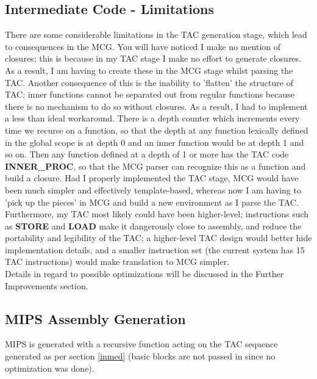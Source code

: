 \documentclass[12pt]{article}
\begin{document}
\subsection{Intermediate Code - Limitations}
There are some considerable limitations in the TAC generation stage, which lead to consequences in the MCG. You will have noticed I make no mention of closures; this is because in my TAC stage I make no effort to generate closures. As a result, I am having to create these in the MCG stage whilst parsing the TAC. Another consequence of this is the inability to 'flatten' the structure of TAC; inner functions cannot be separated out from regular functions because there is no mechanism to do so without closures. As a result, I had to implement a less than ideal workaround. There is a depth counter which increments every time we recurse on a function, so that the depth at any function lexically defined in the global scope is at depth 0 and an inner function would be at depth 1 and so on. Then any function defined at a depth of 1 or more has the TAC code \textbf{INNER\_PROC}, so that the MCG parser can recognize this as a function and build a closure.
Had I properly implemented the TAC stage, MCG would have been much simpler and effectively template-based, whereas now I am having to 'pick up the pieces' in MCG and build a new environment as I parse the TAC. 
\\\newline Furthermore, my TAC most likely could have been higher-level; instructions such as \textbf{STORE} and \textbf{LOAD} make it dangerously close to assembly, and reduce the portability and legibility of the TAC; a higher-level TAC design would better hide implementation details, and a smaller instruction set (the current system has 15 TAC instructions) would make translation to MCG simpler.
\\\newline Details in regard to possible optimizations will be discussed in the Further Improvements section.
\subsection{MIPS Assembly Generation}
MIPS is generated with a recursive function acting on the TAC sequence generated as per section \ref{inmed} (basic blocks are not passed in since no optimization was done).
\end{document}
